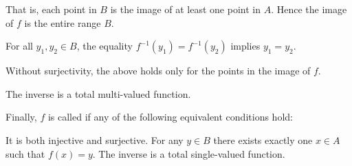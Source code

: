 \begin{definition}
\begin{thmenum}
\begin{minipage}[t]{0.44\textwidth}
\begin{thmenum}[leftmargin=0.9cm]
        That is, each point in \( B \) is the image of at least one point in \( A \). Hence the image of \( f \) is the entire range \( B \).

         For all \( y_1, y_2 \in B \), the equality \( f^{-1}(y_1) = f^{-1}(y_2) \) implies \( y_1 = y_2 \).

        Without surjectivity, the above holds only for the points in the image of \( f \).

         The inverse is a total multi-valued function.
      \end{thmenum}
    \end{minipage}

     Finally, \( f \) is called  if any of the following equivalent conditions hold:
    \begin{thmenum}
       It is both injective and surjective.
       For any \( y \in B \) there exists exactly one \( x \in A \) such that \( f(x) = y \).
       The inverse is a total single-valued function.
    \end{thmenum}
  \end{thmenum}
\end{definition}

